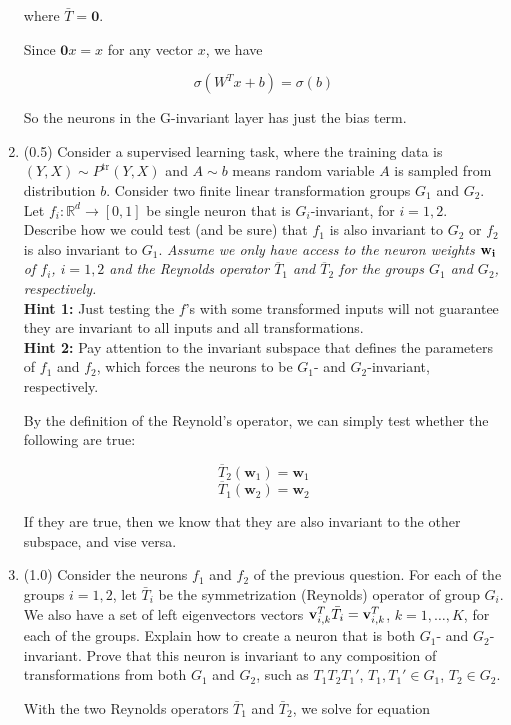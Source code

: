 \documentclass{article}
\begin{document}
\begin{enumerate}
where $\bar{T} = \textbf{0}$. 

Since $\textbf{0} x = x$ for any vector $x$, we have

$$\sigma(W^T x + b) = \sigma(b)$$

So the neurons in the G-invariant layer has just the bias term.


\item (0.5)  Consider a supervised learning task, where the training data is $(Y,X) \sim P^\text{tr}(Y,X)$ and $A \sim b$ means random variable $A$ is sampled from distribution $b$. Consider two finite linear transformation groups $G_1$ and $G_2$. Let $f_i: \mathbb{R}^d \to [0,1]$ be single neuron that is $G_i$-invariant, for $i=1,2$. Describe how we could test (and be sure) that $f_1$ is also invariant to $G_2$ or $f_2$ is also invariant to $G_1$. \textit{Assume we only have access to the neuron weights ${\bf w_i}$ of $f_i$, $i=1,2$ and the Reynolds operator $\overline{T}_1$ and $\overline{T}_2$ for the groups $G_1$ and $G_2$, respectively.} \\
{\bf Hint 1:} Just testing the $f$'s with some transformed inputs will not guarantee they are invariant to all inputs and all transformations.\\
{\bf Hint 2:} Pay attention to the invariant subspace that defines the parameters of $f_1$ and $f_2$, which forces the neurons to be $G_1$- and $G_2$-invariant, respectively.

By the definition of the Reynold's operator, we can simply test whether the following are true:

$$\overline{T}_2(\mathbf{w}_1) = \mathbf{w}_1$$
$$\overline{T}_1(\mathbf{w}_2) = \mathbf{w}_2$$

If they are true, then we know that they are also invariant to the other subspace, and vise versa.

\newpage

\item (1.0) Consider the neurons $f_1$ and $f_2$ of the previous question. For each of the groups $i=1,2$, let $\bar{T}_i$ be the symmetrization (Reynolds) operator of group $G_i$. We also have a set of left eigenvectors vectors
${\bf v}_{i,k}^T \bar{T}_i = {\bf v}_{i,k}^T$, $k=1,\ldots,K$, for each of the groups. Explain how to create a neuron that is both $G_1$- and $G_2$-invariant. Prove that this neuron is invariant to any composition of transformations from both $G_1$ and $G_2$, such as $T_1 T_2 T_1'$, $T_1,T_1' \in G_1$, $T_2 \in G_2$.
%

With the two Reynolds operators $\bar{T}_1$ and $\bar{T}_2$, we solve for equation


\end{enumerate}
\end{document}
